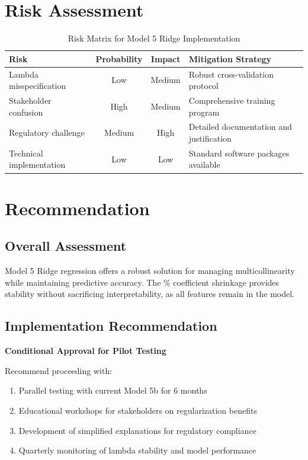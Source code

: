 \section{Risk Assessment}

\begin{table}[h]
\centering
\caption{Risk Matrix for Model 5 Ridge Implementation}
\begin{tabular}{p{3cm}ccp{5cm}}
\toprule
\textbf{Risk} & \textbf{Probability} & \textbf{Impact} & \textbf{Mitigation Strategy} \\
\midrule
Lambda misspecification & Low & Medium & Robust cross-validation protocol \\
Stakeholder confusion & High & Medium & Comprehensive training program \\
Regulatory challenge & Medium & High & Detailed documentation and justification \\
Technical implementation & Low & Low & Standard software packages available \\
\bottomrule
\end{tabular}
\end{table}

\section{Recommendation}

\subsection{Overall Assessment}

Model 5 Ridge regression offers a robust solution for managing multicollinearity while maintaining predictive accuracy. The \ModelFiveShrinkageFactor{}\% coefficient shrinkage provides stability without sacrificing interpretability, as all features remain in the model.

\subsection{Implementation Recommendation}

\textbf{Conditional Approval for Pilot Testing}

Recommend proceeding with:
\begin{enumerate}
    \item Parallel testing with current Model 5b for 6 months
    \item Educational workshops for stakeholders on regularization benefits
    \item Development of simplified explanations for regulatory compliance
    \item Quarterly monitoring of lambda stability and model performance
\end{enumerate}


